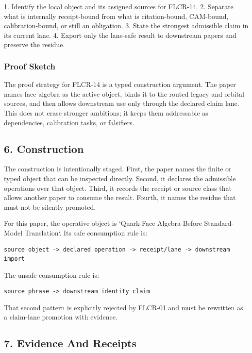 \documentclass[11pt]{article}
\begin{document}
1. Identify the local object and its assigned sources for FLCR-14.
2. Separate what is internally receipt-bound from what is citation-bound, CAM-bound, calibration-bound, or still an obligation.
3. State the strongest admissible claim in its current lane.
4. Export only the lane-safe result to downstream papers and preserve the residue.

\subsubsection*{Proof Sketch}

The proof strategy for FLCR-14 is a typed construction argument. The paper names face algebra as the active object, binds it to the routed legacy and orbital sources, and then allows downstream use only through the declared claim lane. This does not erase stronger ambitions; it keeps them addressable as dependencies, calibration tasks, or falsifiers.

\subsection*{6. Construction}

The construction is intentionally staged. First, the paper names the finite or
typed object that can be inspected directly. Second, it declares the admissible
operations over that object. Third, it records the receipt or source class that
allows another paper to consume the result. Fourth, it names the residue that
must not be silently promoted.

For this paper, the operative object is `Quark-Face Algebra Before Standard-Model Translation`. Its safe consumption
rule is:

\begin{verbatim}
source object -> declared operation -> receipt/lane -> downstream import
\end{verbatim}

The unsafe consumption rule is:

\begin{verbatim}
source phrase -> downstream identity claim
\end{verbatim}

That second pattern is explicitly rejected by FLCR-01 and must be rewritten as
a claim-lane promotion with evidence.

\subsection*{7. Evidence And Receipts}
\end{document}
